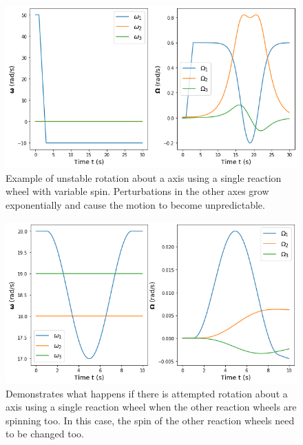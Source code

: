 \documentclass[12]{article}
\begin{document}
\begin{multicols*}{2}
\begin{figure}[H]
\centering
\includegraphics[width=\linewidth]{fig/reaction_single_zero_unstable.png}
\vspace{-0.3cm}
\caption{\label{fig:reaction_single_zero_unstable}Example of unstable rotation about a axis using a single reaction wheel with variable spin. Perturbations in the other axes grow exponentially and cause the motion to become unpredictable.}
\end{figure}

\begin{figure}[H]
\centering
\includegraphics[width=\linewidth]{fig/reaction_naive_attempt.png}
\vspace{-0.3cm}
\caption{\label{fig:reaction_naive_attempt}Demonstrates what happens if there is attempted rotation about a axis using a single reaction wheel when the other reaction wheels are spinning too. In this case, the spin of the other reaction wheels need to be changed too.}
\end{figure}


\end{multicols*}
\end{document}

